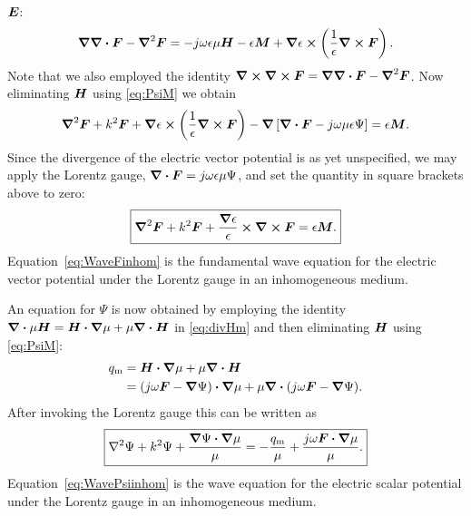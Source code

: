 $\boldsymbol{E}$:
\begin{equation}
  \boldsymbol{\nabla}\boldsymbol{\nabla} \boldsymbol{\cdot}\boldsymbol{F} - \boldsymbol{\nabla}^2\boldsymbol{F} =
  -j\omega\epsilon\mu\boldsymbol{H} - \epsilon\boldsymbol{M} + \boldsymbol{\nabla}\epsilon \boldsymbol{\times} 
  \left(
    \frac{1}{\epsilon} \boldsymbol{\nabla} \boldsymbol{\times}\boldsymbol{F}
  \right).
\end{equation}
Note that we also employed the identity $\boldsymbol{\nabla} \boldsymbol{\times}\boldsymbol{\nabla} \boldsymbol{\times}\boldsymbol{F} = 
  \boldsymbol{\nabla}\boldsymbol{\nabla} \boldsymbol{\cdot}\boldsymbol{F} - \boldsymbol{\nabla}^2\boldsymbol{F}$.
Now eliminating $\boldsymbol{H}$ using \eqref{eq:PsiM} we obtain
\begin{equation}
  \boldsymbol{\nabla}^2\boldsymbol{F} + k^2 \boldsymbol{F} + \boldsymbol{\nabla}\epsilon \boldsymbol{\times}
  \left(
    \frac{1}{\epsilon} \boldsymbol{\nabla} \boldsymbol{\times}\boldsymbol{F}
  \right)
  - \boldsymbol{\nabla} 
  \left[
    \boldsymbol{\nabla} \boldsymbol{\cdot}\boldsymbol{F} - j\omega\mu\epsilon\Psi
  \right]
  = \epsilon\boldsymbol{M}.
\end{equation}
Since the divergence of the electric vector potential is as yet unspecified,
we may apply the Lorentz gauge, $\boldsymbol{\nabla} \boldsymbol{\cdot}\boldsymbol{F} = j\omega\epsilon\mu\Psi$,
and set the quantity in square brackets above to zero:
\begin{equation}
  \boxed{%
  \vlaplace\F + k^2 \F + \frac{\gradient\epsilon}{\epsilon} \cross
  \curl\F
  = \epsilon\M.
  \label{eq:WaveFinhom}
  }
\end{equation}
Equation~\eqref{eq:WaveFinhom} is the fundamental wave equation for 
the electric vector potential under the Lorentz gauge in an inhomogeneous
medium.  

An equation for $\Psi$ is now obtained by employing the
identity $\boldsymbol{\nabla} \boldsymbol{\cdot} \mu\boldsymbol{H} = \boldsymbol{H}\boldsymbol{\cdot}\boldsymbol{\nabla} \mu
+ \mu \boldsymbol{\nabla} \boldsymbol{\cdot}\boldsymbol{H}$ in \eqref{eq:divHm} and then
eliminating $\boldsymbol{H}$ using \eqref{eq:PsiM}:
\begin{align}
  q_{\text{m}}
  &= \boldsymbol{H} \boldsymbol{\cdot} \boldsymbol{\nabla} \mu + \mu \boldsymbol{\nabla} \boldsymbol{\cdot}\boldsymbol{H} \notag \\
  &= (j\omega\boldsymbol{F} - \boldsymbol{\nabla}\Psi) \boldsymbol{\cdot} \boldsymbol{\nabla}\mu
  + \mu \boldsymbol{\nabla} \boldsymbol{\cdot} (j\omega\boldsymbol{F} - \boldsymbol{\nabla}\Psi).
\end{align}
After invoking the Lorentz gauge this can be written as
\begin{equation}
  \boxed{%
  \laplace\Psi + k^2\Psi + \frac{\gradient\Psi \bdot \gradient\mu}{\mu}
  = 
  -\frac{\qm}{\mu} + \frac{j\omega\F \bdot \gradient\mu}{\mu}.
  } \label{eq:WavePsiinhom}
\end{equation}
Equation~\eqref{eq:WavePsiinhom} is the wave equation for 
the electric scalar potential under the Lorentz gauge in an inhomogeneous
medium.  

